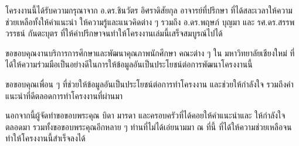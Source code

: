 \begin{acknowledgments}
โครงงานนี้ได้รับความกรุณาจาก อ.ดร.ชินวัตร อิศราดิสัยกุล อาจารย์ที่ปรึกษา ที่ได้สละเวลาให้ความช่วยเหลือทั้งให้คำแนะนำ ให้ความรู้และแนวคิดต่าง ๆ รวมถึง อ.ดร.พฤษภ์ บุญมา และ รศ.ดร.สรรพวรรธน์ กันตะบุตร ที่ให้คำปรึกษาจนทำให้โครงงานเล่มนี้เสร็จสมบูรณ์ไปได้
    
ขอขอบคุณงานบริการการศึกษาและพัฒนาคุณภาพนักศึกษา คณะต่าง ๆ ใน มหาวิทยาลัยเชียงใหม่ ที่ได้ให้ความร่วมมือเป็นอย่างดีในการให้ข้อมูลอันเป็นประโยชน์ต่อการพัฒนาโครงงานนี้

ขอขอบคุณเพื่อน ๆ ที่ช่วยให้ข้อมูลอันเป็นประโยชน์ต่อการทำโครงงาน และช่วยให้กำลังใจ รวมถึงคำแนะนำที่ดีตลอดการทำโครงงานที่ผ่านมา

นอกจากนี้ผู้จัดทำขอขอบพระคุณ บิดา มารดา และครอบครัวที่ได้คอยให้คำแนะนำและ ให้กำลังใจ ตลอดมา รวมทั้งขอขอบพระคุณอีกหลาย ๆ ท่านที่ไม่ได้เอ่ยนามมา ณ ที่นี้ ที่ได้ให้ความช่วยเหลือจนทำให้โครงงานนี้สำเร็จลงได้ 


\end{acknowledgments}%
\fi %

\contentspage

\ifproject
\figurelistpage

\tablelistpage
\fi %




